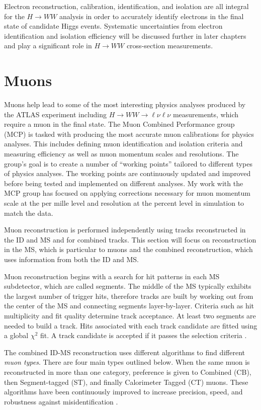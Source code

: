 Electron reconstruction, calibration, identification, and isolation are all integral for the $H\rightarrow WW$ analysis in order to accurately identify electrons in the final state of candidate Higgs events. Systematic uncertainties from electron identification and isolation efficiency will be discussed further in later chapters and play a significant role in $H\rightarrow WW$ cross-section measurements. 

\section{Muons}
Muons help lead to some of the most interesting physics analyses produced by the ATLAS experiment including $H\rightarrow WW\rightarrow \ell\nu\ell\nu$ measurements, which require a muon in the final state. The Muon Combined Performance group (MCP) is tasked with producing the most accurate muon calibrations for physics analyses. This includes defining muon identification and isolation criteria and measuring efficiency as well as muon momentum scales and resolutions. The group's goal is to create a number of ``working points'' tailored to different types of physics analyses. The working points are continuously updated and improved before being tested and implemented on different analyses. My work with the MCP group has focused on applying corrections necessary for muon momentum scale at the per mille level and resolution at the percent level in simulation to match the data. 

Muon reconstruction is performed independently using tracks reconstructed in the ID and MS and for combined tracks. This section will focus on reconstruction in the MS, which is particular to muons and the combined reconstruction, which uses information from both the ID and MS. 

Muon reconstruction begins with a search for hit patterns in each MS subdetector, which are called segments. The middle of the MS typically exhibits the largest number of trigger hits, therefore tracks are built by working out from the center of the MS and connecting segments layer-by-layer. Criteria such as hit multiplicity and fit quality determine track acceptance. At least two segments are needed to build a track. Hits associated with each track candidate are fitted using a global $\chi^2$ fit. A track candidate is accepted if it passes the selection criteria \cite{IDreconstruction}. 

The combined ID-MS reconstruction uses different algorithms to find different \textit{muon types}. There are four main types outlined below. When the same muon is reconstructed in more than one category, preference is given to Combined (CB), then Segment-tagged (ST), and finally Calorimeter Tagged (CT) muons. These algorithms have been continuously improved to increase precision, speed, and robustness against misidentification \cite{MCPpaper}.  

